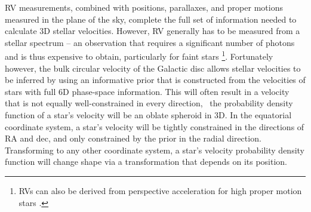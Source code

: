 RV measurements, combined with positions, parallaxes, and proper motions
measured in the plane of the sky, complete the full set of information needed
to calculate 3D stellar velocities.
However, RV generally has to be measured from a stellar spectrum -- an
observation that requires a significant number of photons and is thus
expensive to obtain, particularly for faint stars \footnote{RVs can also be
derived from perspective acceleration for high proper motion stars
\citep[\eg][]{lindegren2021}.}.
Fortunately however, the bulk circular velocity of the Galactic disc allows
stellar velocities to be inferred by using an informative prior that is
constructed from the velocities of stars with full 6D phase-space information.
This will often result in a velocity that is not equally well-constrained in
every direction, \ie\ the probability density function of a star's velocity
will be an oblate spheroid in 3D.
In the equatorial coordinate system, a star's velocity will be tightly
constrained in the directions of RA and dec, and only constrained by
the prior in the radial direction.
Transforming to any other coordinate system, a star's velocity probability
density function will change shape via a transformation that depends on its
position.


